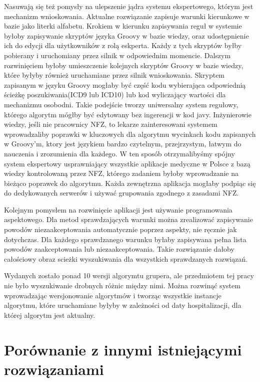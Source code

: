 Nasuwają się też pomysły na ulepszenie jądra systemu ekspertowego, którym jest mechanizm wnioskowania. Aktualne rozwiązanie zapisuje warunki kierunkowe w bazie jako literki alfabetu. Krokiem w kierunku zapisywania reguł w systemie byłoby zapisywanie skryptów języka Groovy w bazie wiedzy, oraz udostępnienie ich do edycji dla użytkowników z rolą eskperta. Każdy z tych skryptów byłby pobierany i uruchomiany przez silnik w odpowiednim momencie.
Dalszym rozwinięciem byłoby umieszczenie kolejnych skryptów Groovy w bazie wiedzy, które byłyby również uruchamiane przez silnik wnioskowania. Skryptem zapisanym w języku Groovy mogłaby być część kodu wybierająca odpowiednią ścieżkę poszukiwania(ICD9 lub ICD10) lub kod wyliczający wartości dla mechanizmu osobodni. Takie podejście tworzy uniwersalny system regułowy, którego algorytm mógłby być edytowany bez ingerencji w kod javy. Inżynierowie wiedzy, jeśli nie pracownicy NFZ, to lekarze zainteresowani systemem wprowadzaliby poprawki w kluczowych dla algorytmu wycinkach kodu zapisanych w Groovy'm, ktory jest językiem bardzo czytelnym, przejrzystym, łatwym do nauczenia i zrozumienia dla każdego. W ten sposób otrzymalibyśmy spójny system ekspertowy usprawniający wszystkie aplikacje medyczne w Polsce z bazą wiedzy kontrolowaną przez NFZ, którego zadaniem byłoby wprowadzanie na bieżąco poprawek do algorytmu. Każda zewnętrzna aplikacja mogłaby podpiąc się do dedykowanych serwerów i używać grupowania zgodnego z zasadami NFZ.

Kolejnym pomysłem na rozwinięcie aplikacji jest używanie programowania aspektowego. Dla metod sprawdzających warunki można zrealizować zapisywanie powodów niezaakceptowania automatycznie poprzez aspekty, nie ręcznie jak dotychczas. Dla każdego sprawdzanego warunku byłaby zapisywana pełna lista powodów zaakceptowania lub niezaakceptowania. Takie rozwiązanie dałoby całościowy obraz scieżki wyszukiwania dla wszystkich sprawdzanych rozwiązań.

Wydanych zostało ponad 10 wersji algorymtu grupera, ale przedmiotem tej pracy nie było wyszukiwanie drobnych różnic między nimi. Można rozwinąć system wprowadzając wersjonowanie algorytmów i tworząc wszystkie instancje algorytmu, które uruchamiane byłyby w zależności od daty hospitalizacji, dla której algorytm jest aktualny.


\section{Porównanie z innymi istniejącymi rozwiązaniami}
\label{sec:porownanieZinnymiRozwiazaniami}

